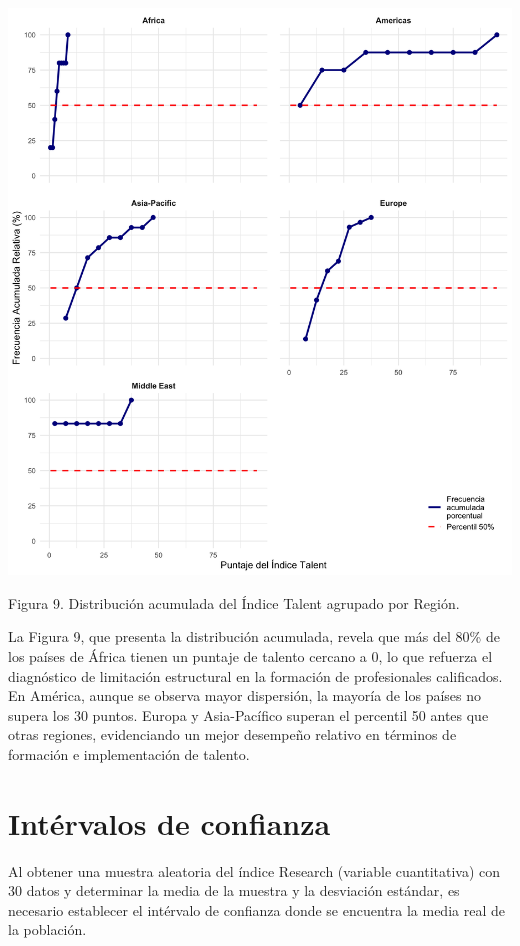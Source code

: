 \documentclass[
]{article}
\begin{document}
\begin{multicols}{2}
\begin{center}
\includegraphics[width=\linewidth]{figura9.png}
\end{center}

Figura 9. Distribución acumulada del Índice Talent agrupado por Región.





La Figura 9, que presenta la distribución acumulada, revela que más del 80\% de los países de África tienen un puntaje de talento cercano a 0, lo que refuerza el diagnóstico de limitación estructural en la formación de profesionales calificados. En América, aunque se observa mayor dispersión, la mayoría de los países no supera los 30 puntos. Europa y Asia-Pacífico superan el percentil 50 antes que otras regiones, evidenciando un mejor desempeño relativo en términos de formación e implementación de talento.



\section{Intérvalos de confianza}

Al obtener una muestra aleatoria del índice Research (variable cuantitativa) con 30 datos y determinar la media de la muestra y la desviación estándar, es necesario establecer el intérvalo de confianza donde se encuentra la media real de la población.


\end{multicols}
\end{document}

